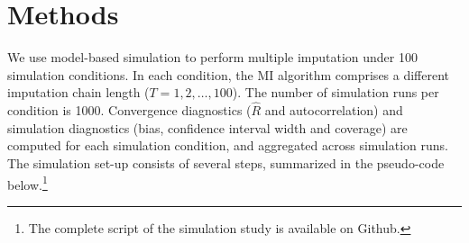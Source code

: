 \documentclass[article]{jss}
\begin{document}
% 
% 



\section{Methods} \label{sec:methods}

We use model-based simulation to perform multiple imputation under 100 simulation conditions. In each condition, the MI algorithm comprises a different imputation chain length ($T = 1, 2, \dots, 100$). The number of simulation runs per condition is 1000. Convergence diagnostics ($\widehat{R}$ and autocorrelation) and simulation diagnostics (bias, confidence interval width and coverage) are computed for each simulation condition, and aggregated across simulation runs.
The simulation set-up consists of several steps, summarized in the pseudo-code below.\footnote{The complete  script of the simulation study is available on Github.}
\end{document}

